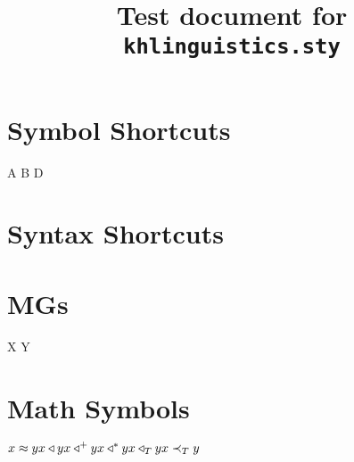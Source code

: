 \documentclass{kharticle}
\title{Test document for \texttt{khlinguistics.sty}}
\begin{document}
\maketitle

\section{Symbol Shortcuts}

\begin{examplebox}
\larrow \rarrow \lrarrow \par
\emptystr \zero \par
\chkmark \xmark \par
\ledge \redge \tedge \bedge \slot \par
A B \gap D \par
{} \par
{} \par
\end{examplebox}

\section{Syntax Shortcuts}

\begin{examplebox}
\emptyD \emptyT \par
\lv \lvb \lvp \par
\Tpast \Tpres
\end{examplebox}

\section{MGs}

\begin{examplebox}
 \par
{} \par
{} \par
X \mergedot Y \par
\end{examplebox}

\section{Math Symbols}

\begin{examplebox}
\begin{math}
x \approx y \\
x \triangleleft y \\
x \triangleleft^+ y \\
x \triangleleft^* y \\
x \triangleleft_T y \\
x \prec_T y
\end{math}
\end{examplebox}
\end{document}

